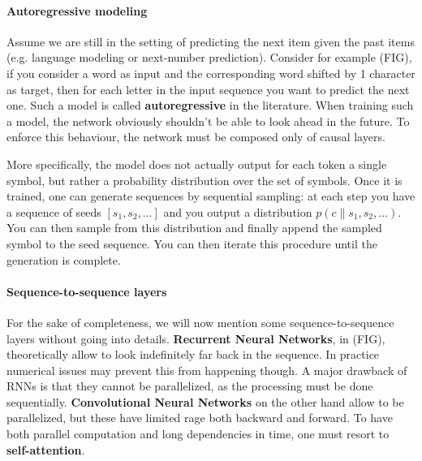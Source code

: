 \paragraph{Autoregressive modeling}
Assume we are still in the setting of predicting the next item given the past items (e.g. language modeling or next-number prediction).
Consider for example (FIG), if you consider a word as input and the corresponding word shifted by 1 character as target, then for each letter in the input sequence you want to predict the next one.
Such a model is called \textbf{autoregressive} in the literature.
When training such a model, the network obviously shouldn't be able to look ahead in the future. To enforce this behaviour, the network must be composed only of causal layers.
 
More specifically, the model does not actually output for each token a single symbol, but rather a probability distribution over the set of symbols. Once it is trained, one can generate sequences by sequential sampling: at each step you have a sequence of seeds $[s_1, s_2, \dots]$ and you output a distribution $p(c \| s_1, s_2, \dots )$. You can then sample from this distribution and finally append the sampled symbol to the seed sequence. You can then iterate this procedure until the generation is complete.

\paragraph{Sequence-to-sequence layers}
For the sake of completeness, we will now mention some sequence-to-sequence layers without going into details.
\textbf{Recurrent Neural Networks}, in (FIG), theoretically allow to look indefinitely far back in the sequence. In practice numerical issues may prevent this from happening though. 
A major drawback of RNNs is that they cannot be parallelized, as the processing must be done sequentially. 
\textbf{Convolutional Neural Networks} on the other hand allow to be parallelized, but these have limited rage both backward and forward. 
To have both parallel computation and long dependencies in time, one must resort to \textbf{self-attention}.

